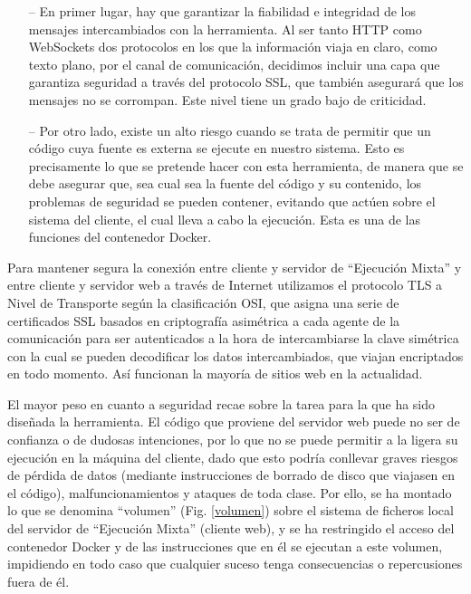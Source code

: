 \begin{itemize}
    \item [--] En primer lugar, hay que garantizar la fiabilidad e integridad de los mensajes intercambiados con la herramienta. Al ser tanto HTTP como WebSockets dos protocolos en los que la información viaja en claro, como texto plano, por el canal de comunicación, decidimos incluir una capa que garantiza seguridad a través del protocolo SSL, que también asegurará que los mensajes no se corrompan. Este nivel tiene un grado bajo de criticidad.
    \item [--] Por otro lado, existe un alto riesgo cuando se trata de permitir que un código cuya fuente es externa se ejecute en nuestro sistema. Esto es precisamente lo que se pretende hacer con esta herramienta, de manera que se debe asegurar que, sea cual sea la fuente del código y su contenido, los problemas de seguridad se pueden contener, evitando que actúen sobre el sistema del cliente, el cual lleva a cabo la ejecución. Esta es una de las funciones del contenedor Docker.
\end{itemize}

Para mantener segura la conexión entre cliente y servidor de ``Ejecución Mixta'' y entre cliente y servidor web a través de Internet utilizamos el protocolo TLS a Nivel de Transporte según la clasificación OSI, que asigna una serie de certificados SSL basados en criptografía asimétrica a cada agente de la comunicación para ser autenticados a la hora de intercambiarse la clave simétrica con la cual se pueden decodificar los datos intercambiados, que viajan encriptados en todo momento. Así funcionan la mayoría de sitios web en la actualidad.

El mayor peso en cuanto a seguridad recae sobre la tarea para la que ha sido diseñada la herramienta. El código que proviene del servidor web puede no ser de confianza o de dudosas intenciones, por lo que no se puede permitir a la ligera su ejecución en la máquina del cliente, dado que esto podría conllevar graves riesgos de pérdida de datos (mediante instrucciones de borrado de disco que viajasen en el código), malfuncionamientos y ataques de toda clase. Por ello, se ha montado lo que se denomina ``volumen'' (Fig. \ref{volumen}) sobre el sistema de ficheros local del servidor de ``Ejecución Mixta'' (cliente web), y se ha restringido el acceso del contenedor Docker y de las instrucciones que en él se ejecutan a este volumen, impidiendo en todo caso que cualquier suceso tenga consecuencias o repercusiones fuera de él. 

